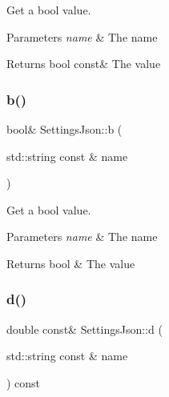 Get a bool value. 


\begin{DoxyParams}{Parameters}
{\em name} & The name \\
\hline
\end{DoxyParams}
\begin{DoxyReturn}{Returns}
bool const\& The value 
\end{DoxyReturn}
\mbox{\label{class_settings_json_aa5ff7200ce8ae660ab3c7c2172040147}} 
\subsubsection{\texorpdfstring{b()}{b()}\hspace{0.1cm}{\footnotesize\ttfamily [2/2]}}
{\footnotesize\ttfamily bool\& Settings\+Json\+::b (\begin{DoxyParamCaption}\item[{std\+::string const \&}]{name }\end{DoxyParamCaption})\hspace{0.3cm}{\ttfamily [inline]}}



Get a bool value. 


\begin{DoxyParams}{Parameters}
{\em name} & The name \\
\hline
\end{DoxyParams}
\begin{DoxyReturn}{Returns}
bool \& The value 
\end{DoxyReturn}
\mbox{\label{class_settings_json_a7105095d0de83e43728f14544a698fc6}} 
\subsubsection{\texorpdfstring{d()}{d()}\hspace{0.1cm}{\footnotesize\ttfamily [1/2]}}
{\footnotesize\ttfamily double const\& Settings\+Json\+::d (\begin{DoxyParamCaption}\item[{std\+::string const \&}]{name }\end{DoxyParamCaption}) const\hspace{0.3cm}{\ttfamily [inline]}}



